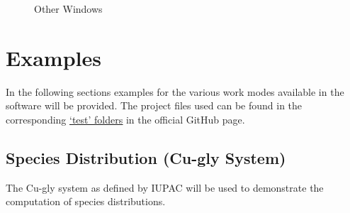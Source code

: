 \documentclass[a4paper, 12pt]{article}
\begin{document}
\begin{figure}[h]%
    \centering
    \qquad
    \caption{Other Windows}%
    \label{fig:other_windows}%
\end{figure}

\clearpage
\newpage

\section{Examples}
\label{sec:examples}

In the following sections examples for the various work modes available in the software will be provided.
The project files used can be found in the corresponding \href{https://github.com/Kastakin/PyES/tree/master/tests/test_data}{\underline{`test' folders}} in the official GitHub page.

\subsection{Species Distribution (Cu-gly System)}
The Cu-gly system as defined by IUPAC will be used to demonstrate the computation of species distributions.
\end{document}
